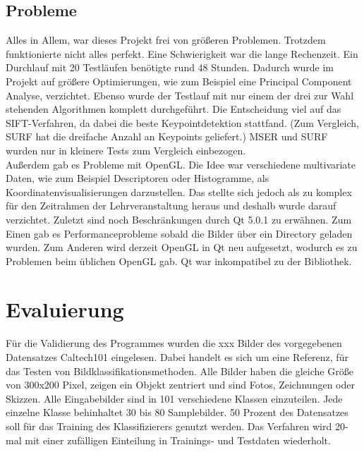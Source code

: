 \documentclass[liststotoc,11pt,a4paper]{article}
\begin{document}
\subsection{Probleme}
Alles in Allem, war dieses Projekt frei von größeren Problemen. Trotzdem funktionierte nicht alles perfekt. Eine Schwierigkeit war die lange Rechenzeit. Ein Durchlauf mit 20 Testläufen benötigte rund 48 Stunden.%
Dadurch wurde im Projekt auf größere Optimierungen, wie zum Beispiel eine Principal Component Analyse, verzichtet. Ebenso wurde der Testlauf mit nur einem der drei zur Wahl stehenden Algorithmen komplett durchgeführt. Die Entscheidung viel auf das SIFT-Verfahren, da dabei die beste Keypointdetektion stattfand. (Zum Vergleich, SURF hat die dreifache Anzahl an Keypoints geliefert.) MSER und SURF wurden nur in kleinere Tests zum Vergleich einbezogen. 
\\Außerdem gab es Probleme mit OpenGL. Die Idee war verschiedene multivariate Daten, wie zum Beispiel Descriptoren oder Histogramme, als Koordinatenvisualisierungen darzustellen. Das stellte sich jedoch als zu komplex für den Zeitrahmen der Lehrveranstaltung heraus und deshalb wurde darauf verzichtet.
Zuletzt sind noch Beschränkungen durch Qt 5.0.1 zu erwähnen. Zum Einen gab es Performanceprobleme sobald die Bilder über ein Directory geladen wurden. Zum Anderen wird derzeit OpenGL in Qt neu aufgesetzt, wodurch es zu Problemen beim üblichen OpenGL gab. Qt war inkompatibel zu der Bibliothek.

\section{Evaluierung}
Für die Validierung des Programmes wurden die xxx Bilder des vorgegebenen Datensatzes Caltech101 eingelesen. Dabei handelt es sich um eine Referenz, für das Testen von Bildklassifikationsmethoden. Alle Bilder haben die gleiche Größe von 300x200 Pixel, zeigen ein Objekt zentriert und sind Fotos, Zeichnungen oder Skizzen. Alle Eingabebilder sind in 101 verschiedene Klassen einzuteilen. Jede einzelne Klasse behinhaltet 30 bis 80 Samplebilder. 
50 Prozent des Datensatzes soll für das Training des Klassifizierers genutzt werden. Das Verfahren wird 20-mal mit einer zufälligen Einteilung in Trainings- und Testdaten wiederholt.




\end{document}
